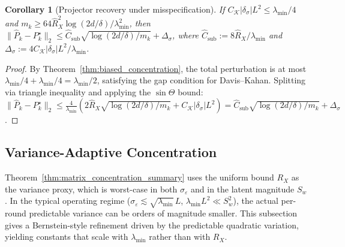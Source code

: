 \documentclass[11pt]{article}
\newtheorem{corollary}{Corollary}
\begin{document}
\begin{corollary}[Projector recovery under misspecification]
\label{cor:projector_misspec}
If $C_{\mathcal{K}}|\delta_\sigma|L^2\le\lambda_{\min}/4$ and
$m_k\ge 64\hat{R}_X^2\log(2d/\delta)/\lambda_{\min}^2$, then
$\|\widehat{P}_k-P_k^\star\|_2
\le\hat{C}_{\mathrm{sub}}\sqrt{\log(2d/\delta)/m_k}+\Delta_\sigma$,
where $\hat{C}_{\mathrm{sub}}:=8\hat{R}_X/\lambda_{\min}$ and
$\Delta_\sigma := 4C_{\mathcal{K}}|\delta_\sigma|L^2/\lambda_{\min}$.
\end{corollary}

\begin{proof}
By Theorem~\ref{thm:biased_concentration}, the total perturbation is at most
$\lambda_{\min}/4+\lambda_{\min}/4=\lambda_{\min}/2$, satisfying the gap condition
for Davis--Kahan.
Splitting via triangle inequality and applying the $\sin\Theta$ bound:
$\|\widehat{P}_k-P_k^\star\|_2
\le\frac{4}{\lambda_{\min}}
  (2\hat{R}_X\sqrt{\log(2d/\delta)/m_k}+C_{\mathcal{K}}|\delta_\sigma|L^2)
= \hat{C}_{\mathrm{sub}}\sqrt{\log(2d/\delta)/m_k}+\Delta_\sigma$.
\end{proof}

\subsection{Variance-Adaptive Concentration}
\label{sec:variance_adaptive}

Theorem~\ref{thm:matrix_concentration_summary} uses the uniform bound
$R_X$ as the variance proxy, which is worst-case in both $\sigma_\varepsilon$
and in the latent magnitude $S_w$.  In the typical operating regime
($\sigma_\varepsilon\lesssim\sqrt{\lambda_{\min}}\,L$,
$\lambda_{\min}L^2\ll S_w^2$), the actual per-round predictable variance
can be orders of magnitude smaller.  This subsection gives a Bernstein-style
refinement driven by the predictable quadratic variation, yielding
constants that scale with $\lambda_{\min}$ rather than with $R_X$.
\end{document}
